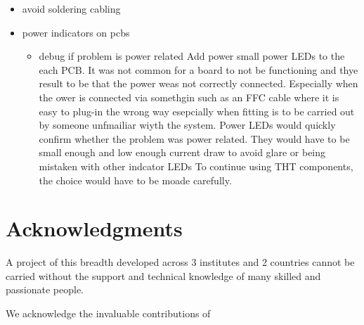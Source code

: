 \begin{itemize}
\tightlist
\item
  avoid soldering cabling
\item
  power indicators on pcbs

  \begin{itemize}
  \tightlist
  \item
    debug if problem is power related Add power small power LEDs to the
    each PCB. It was not common for a board to not be functioning and
    thye result to be that the power weas not correctly connected.
    Especially when the ower is connected via somethgin such as an FFC
    cable where it is easy to plug-in the wrong way esepcially when
    fitting is to be carried out by someone unfmailiar wiyth the system.
    Power LEDs would quickly confirm whether the problem was power
    related. They would have to be small enough and low enough current
    draw to avoid glare or being mistaken with other indcator LEDs To
    continue using THT components, the choice would have to be moade
    carefully.
  \end{itemize}
\end{itemize}

\section{Acknowledgments}\label{acknowledgments}

A project of this breadth developed across 3 institutes and 2 countries
cannot be carried without the support and technical knowledge of many
skilled and passionate people.

We acknowledge the invaluable contributions of

